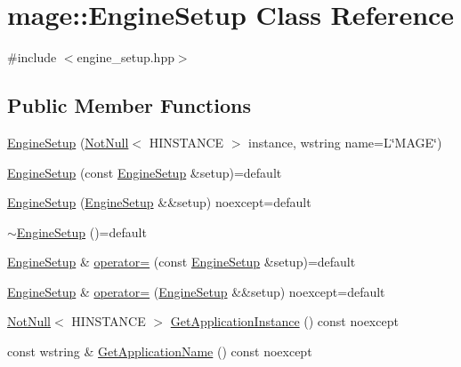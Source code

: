 \hypertarget{classmage_1_1_engine_setup}{}\section{mage\+:\+:Engine\+Setup Class Reference}
\label{classmage_1_1_engine_setup}


{\ttfamily \#include $<$engine\+\_\+setup.\+hpp$>$}

\subsection*{Public Member Functions}
\begin{DoxyCompactItemize}
\item 
\hyperlink{classmage_1_1_engine_setup_a5276975dd2274445f3de58d6666eb37d}{Engine\+Setup} (\hyperlink{namespacemage_a8769f9d670d6b585ea306cb1062af94b}{Not\+Null}$<$ H\+I\+N\+S\+T\+A\+N\+CE $>$ instance, wstring name=L\char`\"{}M\+A\+GE\char`\"{})
\item 
\hyperlink{classmage_1_1_engine_setup_a40980f5fce1554c2a93707efdf4486a9}{Engine\+Setup} (const \hyperlink{classmage_1_1_engine_setup}{Engine\+Setup} \&setup)=default
\item 
\hyperlink{classmage_1_1_engine_setup_a22b87954ad7a2bc26ff7f26fb443c58c}{Engine\+Setup} (\hyperlink{classmage_1_1_engine_setup}{Engine\+Setup} \&\&setup) noexcept=default
\item 
\hyperlink{classmage_1_1_engine_setup_a0480bee101756b72233a1aa7d44eb185}{$\sim$\+Engine\+Setup} ()=default
\item 
\hyperlink{classmage_1_1_engine_setup}{Engine\+Setup} \& \hyperlink{classmage_1_1_engine_setup_a4234ca6df84db6a2005b994ed42da11f}{operator=} (const \hyperlink{classmage_1_1_engine_setup}{Engine\+Setup} \&setup)=default
\item 
\hyperlink{classmage_1_1_engine_setup}{Engine\+Setup} \& \hyperlink{classmage_1_1_engine_setup_a4c2e71f96f138b28fd6ff1c088d05a53}{operator=} (\hyperlink{classmage_1_1_engine_setup}{Engine\+Setup} \&\&setup) noexcept=default
\item 
\hyperlink{namespacemage_a8769f9d670d6b585ea306cb1062af94b}{Not\+Null}$<$ H\+I\+N\+S\+T\+A\+N\+CE $>$ \hyperlink{classmage_1_1_engine_setup_a278a3df908b5b369a597812de4010532}{Get\+Application\+Instance} () const noexcept
\item 
const wstring \& \hyperlink{classmage_1_1_engine_setup_ab79015dba68069256ed42595b30a5728}{Get\+Application\+Name} () const noexcept
\end{DoxyCompactItemize}
